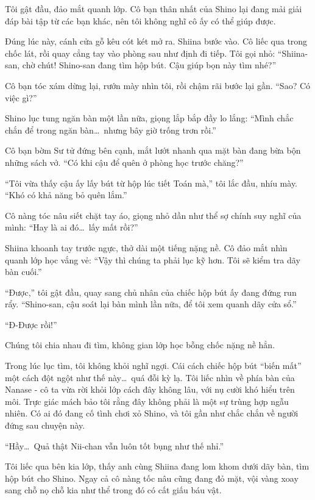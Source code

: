\documentclass[../main.tex]{subfiles}
\begin{document}
Tôi gật đầu, đảo mắt quanh lớp. Cô bạn thân nhất của Shino lại đang mải giải đáp bài tập từ các bạn khác, nên tôi không nghĩ cô ấy có thể giúp được.

Đúng lúc này, cánh cửa gỗ kêu cót két mở ra. Shiina bước vào. Cô liếc qua trong chốc lát, rồi quay cẳng tay vào phòng sau như định đi tiếp. Tôi gọi nhỏ: ``Shiina-san, chờ chút! Shino-san đang tìm hộp bút. Cậu giúp bọn này tìm nhé?''

Cô bạn tóc xám dừng lại, rướn mày nhìn tôi, rồi chậm rãi bước lại gần. ``Sao? Có việc gì?''

Shino lục tung ngăn bàn một lần nữa, giọng lắp bắp đầy lo lắng: ``Mình chắc chắn để trong ngăn bàn\dots\ nhưng bây giờ trống trơn rồi.''

Cô bạn bờm Sư tử đứng bên cạnh, mắt lướt nhanh qua mặt bàn đang bừa bộn những sách vở. ``Có khi cậu để quên ở phòng học trước chăng?''

``Tôi vừa thấy cậu ấy lấy bút từ hộp lúc tiết Toán mà,'' tôi lắc đầu, nhíu mày. ``Khó có khả năng bỏ quên lắm.''

Cô nàng tóc nâu siết chặt tay áo, giọng nhỏ dần như thể sợ chính suy nghĩ của mình: ``Hay là ai đó\dots\ lấy mất rồi?''

Shiina khoanh tay trước ngực, thở dài một tiếng nặng nề. Cô đảo mắt nhìn quanh lớp học vắng vẻ: ``Vậy thì chúng ta phải lục kỹ hơn. Tôi sẽ kiểm tra dãy bàn cuối.''

``Được,'' tôi gật đầu, quay sang chủ nhân của chiếc hộp bút ấy đang đứng run rẩy. ``Shino-san, cậu soát lại bàn mình lần nữa, để tôi xem quanh dãy cửa sổ.''

``Đ-Được rồi!''

Chúng tôi chia nhau đi tìm, không gian lớp học bỗng chốc nặng nề hẳn.

Trong lúc lục tìm, tôi không khỏi nghĩ ngợi. Cái cách chiếc hộp bút ``biến mất'' một cách đột ngột như thế này\dots\ quá đỗi kỳ lạ. Tôi liếc nhìn về phía bàn của Nanase - cô ta vừa rời khỏi lớp cách đây không lâu, với nụ cười khó hiểu trên môi. Trực giác mách bảo tôi rằng đây không phải là một sự trùng hợp ngẫu nhiên. Có ai đó đang cố tình chơi xỏ Shino, và tôi gần như chắc chắn về người đứng sau chuyện này.


``Hầy\dots\ Quả thật Nii-chan vẫn luôn tốt bụng như thế nhỉ.''

Tôi liếc qua bên kia lớp, thấy anh cùng Shiina đang lom khom dưới dãy bàn, tìm hộp bút cho Shino. Ngay cả cô nàng tốc nâu cũng đang đỏ mặt, vội vàng xoay sang chỗ nọ chỗ kia như thể trong đó có cất giấu báu vật.
\end{document}
